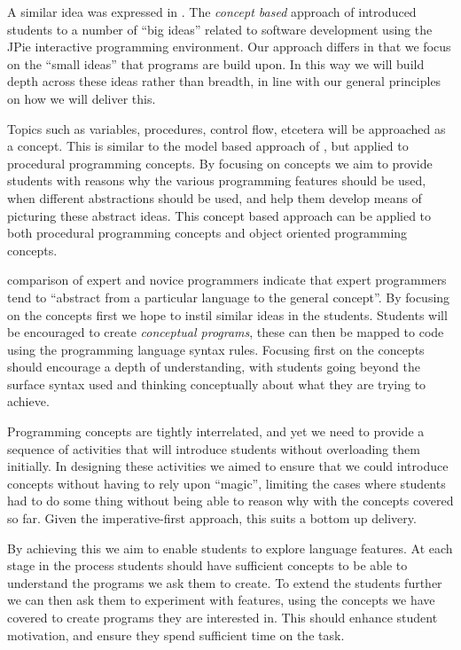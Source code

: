 A similar idea was expressed in \citet{Goldman:2004}. The \emph{concept based} approach of \citet{Goldman:2004} introduced students to a number of ``big ideas'' related to software development using the JPie interactive programming environment. Our approach differs in that we focus on the ``small ideas'' that programs are build upon. In this way we will build depth across these ideas rather than breadth, in line with our general principles on how we will deliver this.

Topics such as variables, procedures, control flow, etcetera will be approached as a concept. This is similar to the model based approach of \citet{Bennedsen:2004}, but applied to procedural programming concepts. By focusing on concepts we aim to provide students with reasons why the various programming features should be used, when different abstractions should be used, and help them develop means of picturing these abstract ideas. This concept based approach can be applied to both procedural programming concepts and object oriented programming concepts.

\citet{Winslow:1996} comparison of expert and novice programmers indicate that expert programmers tend to ``abstract from a particular language to the general concept''. By focusing on the concepts first we hope to instil similar ideas in the students. Students will be encouraged to create \emph{conceptual programs}, these can then be mapped to code using the programming language syntax rules. Focusing first on the concepts should encourage a depth of understanding, with students going beyond the surface syntax used and thinking conceptually about what they are trying to achieve.

Programming concepts are tightly interrelated, and yet we need to provide a sequence of activities that will introduce students without overloading them initially. In designing these activities we aimed to ensure that we could introduce concepts without having to rely upon ``magic'', limiting the cases where students had to do some thing without being able to reason why with the concepts covered so far. Given the imperative-first approach, this suits a bottom up delivery. 

By achieving this we aim to enable students to explore language features. At each stage in the process students should have sufficient concepts to be able to understand the programs we ask them to create. To extend the students further we can then ask them to experiment with features, using the concepts we have covered to create programs they are interested in. This should enhance student motivation, and ensure they spend sufficient time on the task.

